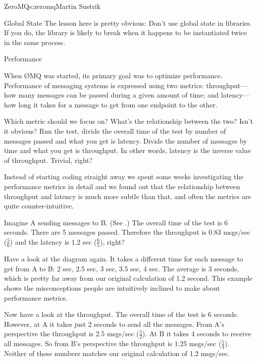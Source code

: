 \begin{aosachapter}{ZeroMQ}{s:zeromq}{Martin Sustrik}
\begin{aosasect1}{Global State}
The lesson here is pretty obvious: Don't use global state in
libraries. If you do, the library is likely to break when
it happens to be instantiated twice in the same process.

\end{aosasect1}

\begin{aosasect1}{Performance}

When {\O}MQ was started, its primary goal was to optimize performance.  
Performance of messaging systems is expressed using two metrics:
throughput---how many messages can be passed during a given amount
of time; and latency---how long it takes for a message to get from
one endpoint to the other.

Which metric should we focus on? What's the relationship between the
two?
Isn't it obvious? Run the test, divide the overall time of the test by
number of messages passed and what you get is latency. Divide the
number of messages by time and what you get is throughput. In other
words, latency is the inverse value of throughput. Trivial, right?

Instead of starting coding straight away we spent some weeks 
investigating the performance metrics in detail and we found out
that the relationship between throughput and latency is much more
subtle than that, and often the metrics are quite counter-intuitive.

\newpage 
{}

Imagine A sending messages to B. (See .)  The
overall time of the test is 6 seconds. There are 5 messages
passed. Therefore the throughput is 0.83 msgs/sec ($\frac{5}{6}$) and 
the latency is 1.2 sec ($\frac{6}{5}$), right?

Have a look at the diagram again. It takes a different time for each
message to get from A to B: 2 sec, 2.5 sec, 3 sec, 3.5 sec, 4 sec. The
average is 3 seconds, which is pretty far away from our original
calculation of 1.2 second.  
This example shows the misconceptions people are intuitively
inclined to make about performance metrics.

Now have a look at the throughput. The overall time of the test is 6
seconds. However, at A it takes just 2 seconds to send all the
messages. From A's perspective the throughput is 2.5 msgs/sec
($\frac{5}{2}$). At B it takes 4 seconds to receive all messages. So from B's
perspective the throughput is 1.25 msgs/sec ($\frac{5}{4}$). Neither of these
numbers matches our original calculation of 1.2 msgs/sec.


\end{aosasect1}
\end{aosachapter}
